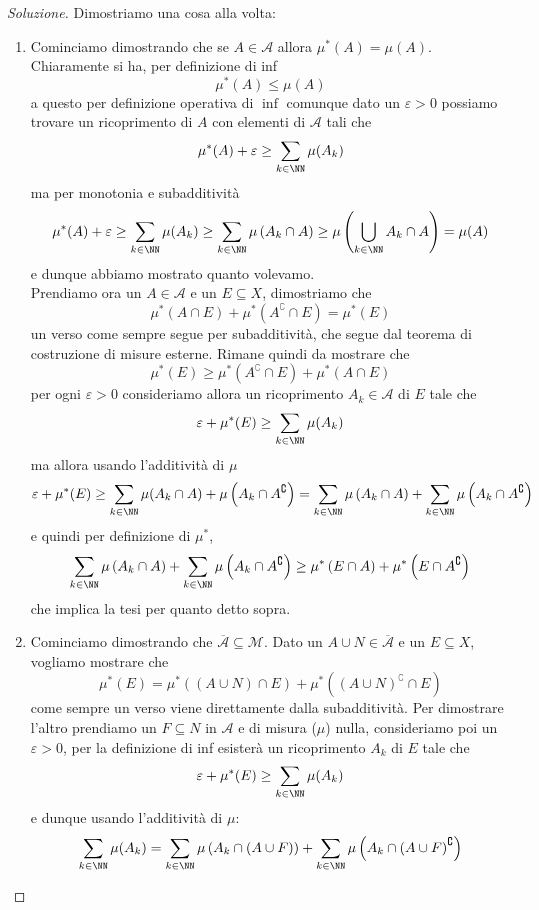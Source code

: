 \documentclass[11pt]{scrartcl}
\begin{document}
	\begin{proof}[Soluzione]
		Dimostriamo una cosa alla volta:
		\begin{enumerate}
			\item Cominciamo dimostrando che se $A\in \mathcal{A}$ allora $\mu^*(A)=\mu(A)$. Chiaramente si ha, per definizione di inf
			$$\mu^*(A)\le \mu(A)$$
			a questo per definizione operativa di $\inf$ comunque dato un $\varepsilon>0$ possiamo trovare un ricoprimento di $A$ con elementi di $\mathcal{A}$ tali che
			$$\mu^*(A)+\varepsilon\ge \sum_{k\in\NN}\mu(A_k)$$
			ma per monotonia e subadditività
			$$\mu^*(A)+\varepsilon \ge \sum_{k\in\NN}\mu(A_k) \ge \sum_{k\in\NN}\mu\left(A_k\cap A\right)\ge \mu\left(\bigcup_{k\in\NN}A_k\cap A\right)=\mu(A)$$
			e dunque abbiamo mostrato quanto volevamo. \\
			Prendiamo ora un $A\in \mathcal{A}$ e un $E\subseteq X$, dimostriamo che
			$$\mu^*(A\cap E)+\mu^*(A^\complement\cap E)=\mu^*(E)$$
			un verso come sempre segue per subadditività, che segue dal teorema di costruzione di misure esterne. Rimane quindi da mostrare che 
			$$\mu^*(E)\ge \mu^*(A^\complement\cap E)+\mu^*(A\cap E)$$
			per ogni $\varepsilon>0$ consideriamo allora un ricoprimento $A_k\in \mathcal{A}$ di $E$ tale che
			$$\varepsilon+\mu^*(E)\ge \sum_{k\in\NN}\mu(A_k)$$
			ma allora usando l'additività di $\mu$
			$$\varepsilon+\mu^*(E)\ge \sum_{k\in\NN}\mu(A_k\cap A)+\mu\left(A_k\cap A^\complement\right)=\sum_{k\in\NN}\mu\left(A_k\cap A\right)+\sum_{k\in\NN}\mu\left(A_k\cap A^\complement\right)$$
			e quindi per definizione di $\mu^*$,
			$$\sum_{k\in\NN}\mu\left(A_k\cap A\right)+\sum_{k\in\NN}\mu\left(A_k\cap A^\complement\right)\ge \mu^*\left(E\cap A\right)+\mu^*\left(E\cap A^\complement\right)$$
			che implica la tesi per quanto detto sopra.
			\item Cominciamo dimostrando che $\overline{\mathcal{A}}\subseteq \mathcal{M}$. Dato un $A\cup N\in \overline{\mathcal{A}}$ e un $E\subseteq X$, vogliamo mostrare che
			$$\mu^*(E)=\mu^*\left(\left(A\cup N\right)\cap E\right)+\mu^*\left(\left(A\cup N\right)^\complement \cap E\right)$$
			come sempre un verso viene direttamente dalla subadditività. Per dimostrare l'altro prendiamo un $F\subseteq N$ in $\mathcal{A}$ e di misura ($\mu$) nulla, consideriamo poi un $\varepsilon>0$, per la definizione di inf esisterà un ricoprimento $A_k$ di $E$ tale che
			$$\varepsilon+\mu^*(E)\ge \sum_{k\in\NN}\mu(A_k)$$
			e dunque usando l'additività di $\mu$:
			$$\sum_{k\in\NN}\mu(A_k)=\sum_{k\in\NN}\mu\left(A_k\cap \left(A\cup F\right)\right)+\sum_{k\in\NN}\mu\left(A_k\cap \left(A\cup F\right)^\complement\right)$$

\end{enumerate}
\end{proof}
\end{document}
